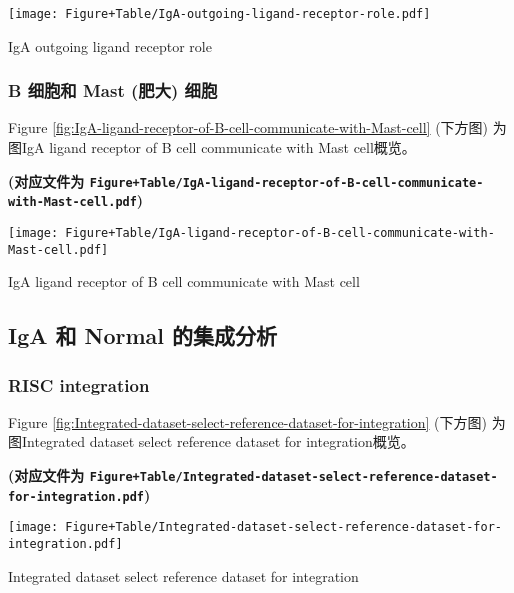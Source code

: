 \documentclass[
]{article}
\begin{document}
\def\@captype{figure}
\begin{center}
\texttt{[image: Figure+Table/IgA-outgoing-ligand-receptor-role.pdf]}
\caption{IgA outgoing ligand receptor role}\label{fig:IgA-outgoing-ligand-receptor-role}
\end{center}

\hypertarget{b-ux7ec6ux80deux548c-mast-ux80a5ux5927-ux7ec6ux80de}{%
\subsubsection{B 细胞和 Mast (肥大) 细胞}\label{b-ux7ec6ux80deux548c-mast-ux80a5ux5927-ux7ec6ux80de}}

Figure \ref{fig:IgA-ligand-receptor-of-B-cell-communicate-with-Mast-cell} (下方图) 为图IgA ligand receptor of B cell communicate with Mast cell概览。

\textbf{(对应文件为 \texttt{Figure+Table/IgA-ligand-receptor-of-B-cell-communicate-with-Mast-cell.pdf})}

\def\@captype{figure}
\begin{center}
\texttt{[image: Figure+Table/IgA-ligand-receptor-of-B-cell-communicate-with-Mast-cell.pdf]}
\caption{IgA ligand receptor of B cell communicate with Mast cell}\label{fig:IgA-ligand-receptor-of-B-cell-communicate-with-Mast-cell}
\end{center}

\hypertarget{iga-ux548c-normal-ux7684ux96c6ux6210ux5206ux6790}{%
\subsection{IgA 和 Normal 的集成分析}\label{iga-ux548c-normal-ux7684ux96c6ux6210ux5206ux6790}}

\hypertarget{risc-integration}{%
\subsubsection{RISC integration}\label{risc-integration}}

Figure \ref{fig:Integrated-dataset-select-reference-dataset-for-integration} (下方图) 为图Integrated dataset select reference dataset for integration概览。

\textbf{(对应文件为 \texttt{Figure+Table/Integrated-dataset-select-reference-dataset-for-integration.pdf})}

\def\@captype{figure}
\begin{center}
\texttt{[image: Figure+Table/Integrated-dataset-select-reference-dataset-for-integration.pdf]}
\caption{Integrated dataset select reference dataset for integration}\label{fig:Integrated-dataset-select-reference-dataset-for-integration}
\end{center}
\end{document}
